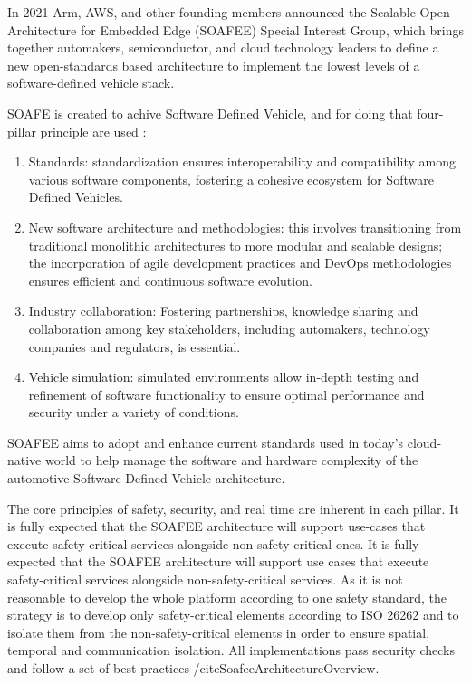 In 2021 Arm, AWS, and other founding members announced the Scalable Open Architecture for Embedded Edge (SOAFEE) Special Interest Group, which brings together automakers, semiconductor, and cloud technology leaders to define a new open-standards based architecture to implement the lowest levels of a software-defined vehicle stack. \cite{DevelopersWorkflow}

SOAFE is created to achive Software Defined Vehicle, and for doing that four-pillar principle are used \cite{SoafeeProject}:
\begin{enumerate}
    \item Standards: standardization ensures interoperability and compatibility among various software components, fostering a cohesive ecosystem for Software Defined Vehicles.
    \item New software architecture and methodologies: this involves transitioning from traditional monolithic architectures to more modular and scalable designs; the incorporation of agile development practices and DevOps methodologies ensures efficient and continuous software evolution.
    \item Industry collaboration: Fostering partnerships, knowledge sharing and collaboration among key stakeholders, including automakers, technology companies and regulators, is essential.
    \item Vehicle simulation: simulated environments allow in-depth testing and refinement of software functionality to ensure optimal performance and security under a variety of conditions.
\end{enumerate}
SOAFEE aims to adopt and enhance current standards used in today's cloud-native world to help manage the software and hardware complexity of the automotive Software Defined Vehicle architecture.

The core principles of safety, security, and real time are inherent in each pillar. It is fully expected that the SOAFEE architecture will support use-cases that execute safety-critical services alongside non-safety-critical ones. It is fully expected that the SOAFEE architecture will support use cases that execute safety-critical services alongside non-safety-critical services. As it is not reasonable to develop the whole platform according to one safety standard, the strategy is to develop only safety-critical elements according to ISO 26262 and to isolate them from the non-safety-critical elements in order to ensure spatial, temporal and communication isolation. All implementations pass security checks and follow a set of best practices /cite{SoafeeArchitectureOverview}.

